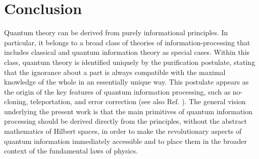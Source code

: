 \documentclass[12pt,aps,pra,showpacs,groupedaddress]{revtex4-1}
\begin{document}
 
 
 
\section{Conclusion}\label{sec:conclusion}
  
Quantum theory can be derived from purely informational principles.  In particular, it belongs to a
broad class of theories of information-processing that includes classical and quantum information
theory as  special cases.  Within this class, quantum theory is identified uniquely by the
purification postulate, stating that the ignorance about a part is always compatible with the
maximal knowledge of the whole in an essentially unique way.  This postulate appears as the origin
of the key features of quantum information
processing, such as no-cloning, teleportation, and error correction (see also Ref.
\cite{purification}). 
The general vision underlying the present work is that the main
primitives of quantum information processing should be derived
directly from the principles, without the abstract mathematics of
Hilbert spaces, in order to make the revolutionary aspects of quantum
information immediately accessible and to place them in the broader
context of the fundamental laws of physics.

\end{document}
